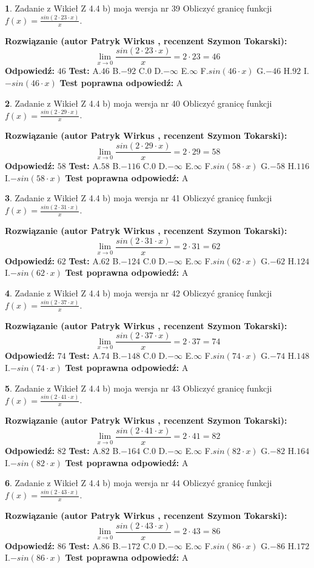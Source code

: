 \documentclass[12pt, a4paper]{article}
\theoremstyle{definition} %
\newtheorem{zad}{}
\newcommand{\zadStart}[1]{\begin{zad}#1\newline}
\newcommand{\zadStop}{\end{zad}}
\newcommand{\rozwStart}[2]{\noindent \textbf{Rozwiązanie (autor #1 , recenzent #2): }\newline}
\newcommand{\rozwStop}{\newline}
\newcommand{\odpStart}{\noindent \textbf{Odpowiedź:}\newline}
\newcommand{\odpStop}{\newline}
\newcommand{\testStart}{\noindent \textbf{Test:}\newline}
\newcommand{\testStop}{\newline}
\newcommand{\kluczStart}{\noindent \textbf{Test poprawna odpowiedź:}\newline}
\newcommand{\kluczStop}{\newline}
\begin{document}
\zadStart{Zadanie z Wikieł Z 4.4 b) moja wersja nr 39}
Obliczyć granicę funkcji $f(x)=\frac{sin(2 \cdot23\cdot x)}{x}$.
\zadStop
\rozwStart{Patryk Wirkus}{Szymon Tokarski}
$$\lim\limits_{x\to 0}\frac{sin(2 \cdot 23\cdot x)}{x}=
2 \cdot 23 = 46$$
\rozwStop
\odpStart
$46$
\odpStop
\testStart
A.$46$
B.$-92$
C.$0$
D.$-\infty$
E.$\infty$
F.$sin(46\cdot x)$
G.$-46$
H.$92$
I.$-sin(46\cdot x)$
\testStop
\kluczStart
A
\kluczStop



\zadStart{Zadanie z Wikieł Z 4.4 b) moja wersja nr 40}
Obliczyć granicę funkcji $f(x)=\frac{sin(2 \cdot29\cdot x)}{x}$.
\zadStop
\rozwStart{Patryk Wirkus}{Szymon Tokarski}
$$\lim\limits_{x\to 0}\frac{sin(2 \cdot 29\cdot x)}{x}=
2 \cdot 29 = 58$$
\rozwStop
\odpStart
$58$
\odpStop
\testStart
A.$58$
B.$-116$
C.$0$
D.$-\infty$
E.$\infty$
F.$sin(58\cdot x)$
G.$-58$
H.$116$
I.$-sin(58\cdot x)$
\testStop
\kluczStart
A
\kluczStop



\zadStart{Zadanie z Wikieł Z 4.4 b) moja wersja nr 41}
Obliczyć granicę funkcji $f(x)=\frac{sin(2 \cdot31\cdot x)}{x}$.
\zadStop
\rozwStart{Patryk Wirkus}{Szymon Tokarski}
$$\lim\limits_{x\to 0}\frac{sin(2 \cdot 31\cdot x)}{x}=
2 \cdot 31 = 62$$
\rozwStop
\odpStart
$62$
\odpStop
\testStart
A.$62$
B.$-124$
C.$0$
D.$-\infty$
E.$\infty$
F.$sin(62\cdot x)$
G.$-62$
H.$124$
I.$-sin(62\cdot x)$
\testStop
\kluczStart
A
\kluczStop



\zadStart{Zadanie z Wikieł Z 4.4 b) moja wersja nr 42}
Obliczyć granicę funkcji $f(x)=\frac{sin(2 \cdot37\cdot x)}{x}$.
\zadStop
\rozwStart{Patryk Wirkus}{Szymon Tokarski}
$$\lim\limits_{x\to 0}\frac{sin(2 \cdot 37\cdot x)}{x}=
2 \cdot 37 = 74$$
\rozwStop
\odpStart
$74$
\odpStop
\testStart
A.$74$
B.$-148$
C.$0$
D.$-\infty$
E.$\infty$
F.$sin(74\cdot x)$
G.$-74$
H.$148$
I.$-sin(74\cdot x)$
\testStop
\kluczStart
A
\kluczStop



\zadStart{Zadanie z Wikieł Z 4.4 b) moja wersja nr 43}
Obliczyć granicę funkcji $f(x)=\frac{sin(2 \cdot41\cdot x)}{x}$.
\zadStop
\rozwStart{Patryk Wirkus}{Szymon Tokarski}
$$\lim\limits_{x\to 0}\frac{sin(2 \cdot 41\cdot x)}{x}=
2 \cdot 41 = 82$$
\rozwStop
\odpStart
$82$
\odpStop
\testStart
A.$82$
B.$-164$
C.$0$
D.$-\infty$
E.$\infty$
F.$sin(82\cdot x)$
G.$-82$
H.$164$
I.$-sin(82\cdot x)$
\testStop
\kluczStart
A
\kluczStop



\zadStart{Zadanie z Wikieł Z 4.4 b) moja wersja nr 44}
Obliczyć granicę funkcji $f(x)=\frac{sin(2 \cdot43\cdot x)}{x}$.
\zadStop
\rozwStart{Patryk Wirkus}{Szymon Tokarski}
$$\lim\limits_{x\to 0}\frac{sin(2 \cdot 43\cdot x)}{x}=
2 \cdot 43 = 86$$
\rozwStop
\odpStart
$86$
\odpStop
\testStart
A.$86$
B.$-172$
C.$0$
D.$-\infty$
E.$\infty$
F.$sin(86\cdot x)$
G.$-86$
H.$172$
I.$-sin(86\cdot x)$
\testStop
\kluczStart
A
\kluczStop
\end{document}
